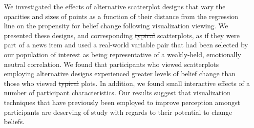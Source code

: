 \documentclass[manuscript,screen,review,anonymous]{acmart}
\providecommand{\DIFaddtex}[1]{{\protect\color{blue}\uwave{#1}}} %
\providecommand{\DIFdeltex}[1]{{\protect\color{red}\sout{#1}}} %
\providecommand{\DIFaddbegin}{} %
\providecommand{\DIFaddend}{} %
\providecommand{\DIFdelbegin}{} %
\providecommand{\DIFdelend}{} %
\providecommand{\DIFadd}[1]{\texorpdfstring{\DIFaddtex{#1}}{#1}} %
\providecommand{\DIFdel}[1]{\texorpdfstring{\DIFdeltex{#1}}{}} %
\newcommand{\DIFscaledelfig}{0.5}
\newlength{\DIFdelgraphicswidth} %
\newlength{\DIFdelgraphicsheight} %
\newcommand{\DIFaddincludegraphics}[2][]{{\color{blue}\fbox{\DIFOincludegraphics[#1]{#2}}}} %
\newcommand{\DIFdelincludegraphics}[2][]{%
\sbox{\DIFdelgraphicsbox}{\DIFOincludegraphics[#1]{#2}}%
\settoboxwidth{\DIFdelgraphicswidth}{\DIFdelgraphicsbox} %
\settoboxtotalheight{\DIFdelgraphicsheight}{\DIFdelgraphicsbox} %
\scalebox{\DIFscaledelfig}{%
\parbox[b]{\DIFdelgraphicswidth}{\usebox{\DIFdelgraphicsbox}\\[-\baselineskip] \rule{\DIFdelgraphicswidth}{0em}}\llap{\resizebox{\DIFdelgraphicswidth}{\DIFdelgraphicsheight}{%
\setlength{\unitlength}{\DIFdelgraphicswidth}%
\begin{picture}(1,1)%
\thicklines\linethickness{2pt} %
{\color[rgb]{1,0,0}\put(0,0){\framebox(1,1){}}}%
{\color[rgb]{1,0,0}\put(0,0){\line( 1,1){1}}}%
{\color[rgb]{1,0,0}\put(0,1){\line(1,-1){1}}}%
\end{picture}%
}\hspace*{3pt}}} %
} %
\DeclareRobustCommand{\DIFaddbegin}{\DIFOaddbegin \let\includegraphics\DIFaddincludegraphics} %
\DeclareRobustCommand{\DIFaddend}{\DIFOaddend \let\includegraphics\DIFOincludegraphics} %
\DeclareRobustCommand{\DIFdelbegin}{\DIFOdelbegin \let\includegraphics\DIFdelincludegraphics} %
\DeclareRobustCommand{\DIFdelend}{\DIFOaddend \let\includegraphics\DIFOincludegraphics} %
\begin{document}
We investigated the effects of alternative scatterplot designs that vary
the opacities and sizes of points as a function of their distance from
the regression line on the propensity for belief change following
visualization viewing. We presented these designs, and corresponding
\DIFdelbegin \DIFdel{typical }\DIFdelend \DIFaddbegin \DIFadd{standard }\DIFaddend scatterplots, as if they were part of a news item and used a
real-world variable pair that had been selected by our population of
interest as being representative of a weakly-held, emotionally neutral
correlation. We found that participants who viewed scatterplots
employing alternative designs experienced greater levels of belief
change than those who viewed \DIFdelbegin \DIFdel{typical }\DIFdelend \DIFaddbegin \DIFadd{standard }\DIFaddend plots. In addition, we found small
interactive effects of a number of participant characteristics. Our
results suggest that visualization techniques that have previously been
employed to improve perception amongst participants are deserving of
study with regards to their potential to change beliefs.


\DIFdelbegin %
\DIFdelend \DIFaddbegin 
\DIFaddend 

\end{document}

